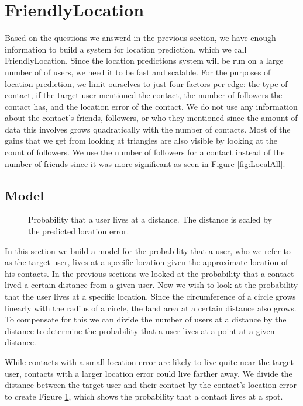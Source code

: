 \documentclass{sig-alternate}
\begin{document}
\section{FriendlyLocation}
Based on the questions we answerd in the previous section, we have enough
information to build a system for location prediction, which we call FriendlyLocation.
Since the location predictions system will be run on a large number of of users, we need it to be fast and scalable.
For the purposes of location prediction, we limit ourselves to just four factors per edge: the type of contact, if the target user mentioned the contact, the number of followers the contact has, and the location error of the contact.
We do not use any information about the contact's friends, followers, or who they mentioned since the amount of data this involves grows quadratically with the number of contacts.
Most of the gains that we get from looking at triangles are also visible by looking at the count of followers.
We use the number of followers for a contact instead of the number of friends since it was more significant as seen in Figure \ref{fig:LocalAll}.

\subsection{Model}
\label{sec:model}

\begin{figure}
\centering
{}
\caption{Probability that a user lives at a distance. The distance is scaled by the predicted location error.}
\label{fig:EdgeTypesMdist}
\end{figure}

In this section we build a model for the probability that a user, who we refer to as the target user, lives at a specific location given the approximate location of his contacts.
In the previous sections we looked at the probability that a contact lived a certain distance from a given user. Now we wish to look at the probability that the user lives at a specific location. Since the circumference of a circle grows linearly with the radius of a circle, the land area at a certain distance also grows. To compensate for this we can divide the number of users at a distance by the distance to determine the probability that a user lives at a point at a given distance.

While contacts with a small location error are likely to live quite near the target user, contacts with a larger location error could live farther away. 
We divide the distance between the target user and their contact by the contact's location error to create Figure \ref{fig:EdgeTypesMdist}, which shows the probability that a contact lives at a spot.
\end{document}
